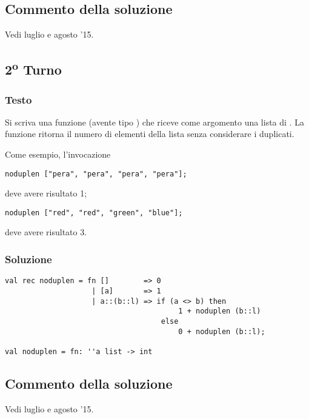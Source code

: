 \subsection{Commento della soluzione}

Vedi luglio e agosto '15.


\subsection{2\textsuperscript{o} Turno}

\subsubsection{Testo}

Si scriva una funzione  (avente tipo ) che riceve come argomento una lista di .
La funzione  ritorna il numero di elementi della lista senza considerare i duplicati.

\medskip
Come esempio, l'invocazione

\begin{lstlisting}
noduplen ["pera", "pera", "pera", "pera"];
\end{lstlisting}

deve avere risultato 1;

\begin{lstlisting}
noduplen ["red", "red", "green", "blue"];
\end{lstlisting}

deve avere risultato 3.

\subsubsection{Soluzione}

\begin{lstlisting}[style = SML, caption = {Definizione della funzione \sml{noduplen}}]
val rec noduplen = fn []		=> 0
					| [a]		=> 1
					| a::(b::l)	=> if (a <> b) then
										1 + noduplen (b::l)
									else
										0 + noduplen (b::l);

val noduplen = fn: ''a list -> int
\end{lstlisting}

\subsection{Commento della soluzione}

Vedi luglio e agosto '15.
